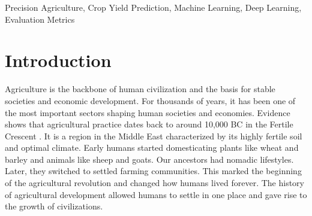 \documentclass[conference]{IEEEtran}
\begin{document}
\begin{abstract}
Farming has evolved from the basic irrigation techniques used in ancient river valley civilizations to the sophisticated Precision Agriculture of today, playing an important role in the advancement of human society. This paper explores the use of Machine Learning and Deep Learning algorithms in Precision Agriculture, an essential task in agriculture that helps ensure a stable food supply and improves the efficiency of food production. Despite advances in Precision Agriculture and the widespread adoption of Machine Learning and Deep Learning algorithms, a comprehensive review that systematically addresses the challenges of data quality, model interoperability, and multisource data integration in Precision Agriculture is still lacking. To bridge this gap, we conducted a systematic review of more than 100 studies published between 2021 and 2024. Our analysis focuses on the application of several Machine Learning and Deep Learning algorithms, such as Artificial Neural Networks, Support Vector Machines, Convolutional Neural Networks, and Random Forests. Using a comparative analysis methodology, we identify key features influencing Precision Agriculture, such as temperature, rainfall, remote sensing data, and soil types. Our findings highlight ongoing challenges in standardizing data protocols and developing Explainable AI models that can be generalized across diverse agricultural conditions. The key takeaway is that integrating IoT with real-time data processing can significantly improve agricultural resilience and efficiency. Future research should focus on refining robust models and expanding multisource data integration to effectively address these challenges.
\end{abstract}

\begin{IEEEkeywords}
Precision Agriculture, Crop Yield Prediction, Machine Learning, Deep Learning, Evaluation Metrics
\end{IEEEkeywords}

\section{Introduction}
Agriculture is the backbone of human civilization and the basis for stable societies and economic development. For thousands of years, it has been one of the most important sectors shaping human societies and economies. Evidence shows that agricultural practice dates back to around 10,000 BC in the Fertile Crescent  \cite{b1}. It is a region in the Middle East characterized by its highly fertile soil and optimal climate. Early humans started domesticating plants like wheat and barley and animals like sheep and goats. Our ancestors had nomadic lifestyles. Later, they switched to settled farming communities. This marked the beginning of the agricultural revolution and changed how humans lived forever. The history of agricultural development allowed humans to settle in one place and gave rise to the growth of civilizations.
\end{document}
